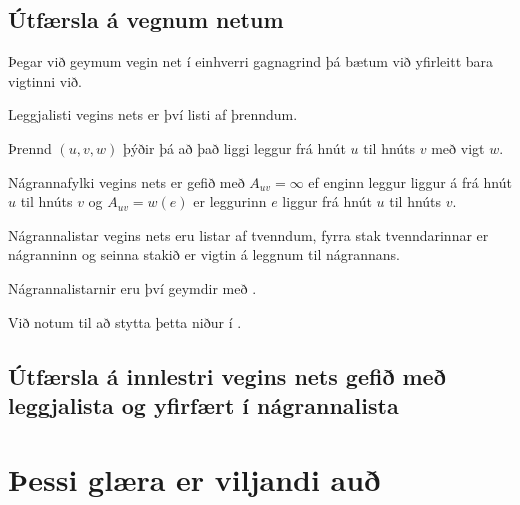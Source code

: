 \subsection{Útfærsla á vegnum netum}
{
	{
		\item<1-> Þegar við geymum vegin net í einhverri gagnagrind þá bætum við yfirleitt bara vigtinni við.
		\item<2-> Leggjalisti vegins nets er því listi af þrenndum.
		\item<3-> Þrennd $(u, v, w)$ þýðir þá að það liggi leggur frá hnút $u$ til hnúts $v$ með vigt $w$.
		\item<4-> Nágrannafylki vegins nets er gefið með $A_{uv} = \infty$ ef enginn leggur liggur á frá hnút $u$ til hnúts $v$ og
					$A_{uv} = w(e)$ er leggurinn $e$ liggur frá hnút $u$ til hnúts $v$.
		\item<5-> Nágrannalistar vegins nets eru listar af tvenndum, fyrra stak tvenndarinnar er nágranninn og seinna stakið er vigtin á leggnum
					til nágrannans.
		\item<6-> Nágrannalistarnir eru því geymdir með .
		\item<7-> Við notum  til að stytta þetta niður í .
	}
}

\subsection{Útfærsla á innlestri vegins nets gefið með leggjalista og yfirfært í nágrannalista}
{
}

\section{Þessi glæra er viljandi auð}
{
}


